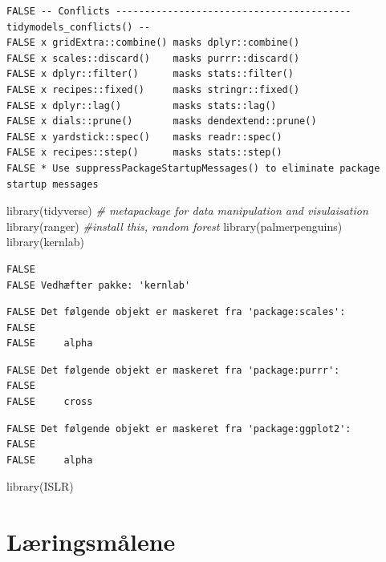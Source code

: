 \documentclass[
]{book}
\newenvironment{Shaded}{\begin{snugshade}}{\end{snugshade}}
\newcommand{\CommentTok}[1]{\textcolor[rgb]{0.56,0.35,0.01}{\textit{#1}}}
\newcommand{\FunctionTok}[1]{\textcolor[rgb]{0.00,0.00,0.00}{#1}}
\newcommand{\NormalTok}[1]{#1}
\begin{document}
\begin{verbatim}
FALSE -- Conflicts ----------------------------------------- tidymodels_conflicts() --
FALSE x gridExtra::combine() masks dplyr::combine()
FALSE x scales::discard()    masks purrr::discard()
FALSE x dplyr::filter()      masks stats::filter()
FALSE x recipes::fixed()     masks stringr::fixed()
FALSE x dplyr::lag()         masks stats::lag()
FALSE x dials::prune()       masks dendextend::prune()
FALSE x yardstick::spec()    masks readr::spec()
FALSE x recipes::step()      masks stats::step()
FALSE * Use suppressPackageStartupMessages() to eliminate package startup messages
\end{verbatim}

\begin{Shaded}
\begin{Highlighting}[]
\FunctionTok{library}\NormalTok{(tidyverse) }\CommentTok{\# metapackage for data manipulation and visulaisation}
\FunctionTok{library}\NormalTok{(ranger) }\CommentTok{\#install this, random forest}
\FunctionTok{library}\NormalTok{(palmerpenguins)}
\FunctionTok{library}\NormalTok{(kernlab)}
\end{Highlighting}
\end{Shaded}

\begin{verbatim}
FALSE 
FALSE Vedhæfter pakke: 'kernlab'
\end{verbatim}

\begin{verbatim}
FALSE Det følgende objekt er maskeret fra 'package:scales':
FALSE 
FALSE     alpha
\end{verbatim}

\begin{verbatim}
FALSE Det følgende objekt er maskeret fra 'package:purrr':
FALSE 
FALSE     cross
\end{verbatim}

\begin{verbatim}
FALSE Det følgende objekt er maskeret fra 'package:ggplot2':
FALSE 
FALSE     alpha
\end{verbatim}

\begin{Shaded}
\begin{Highlighting}[]
\FunctionTok{library}\NormalTok{(ISLR)}
\end{Highlighting}
\end{Shaded}

\hypertarget{luxe6ringsmuxe5lene-7}{%
\section{Læringsmålene}\label{luxe6ringsmuxe5lene-7}}
\end{document}
